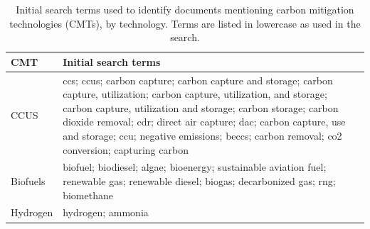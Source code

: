 \begin{table}[htbp]
\centering
\footnotesize
\begin{tabularx}{\textwidth}{@{}p{2.4cm}X@{}}
\toprule
\textbf{CMT} & \textbf{Initial search terms} \\
\midrule
CCUS & ccs; ccus; carbon capture; carbon capture and storage; carbon capture, utilization; carbon capture, utilization, and storage; carbon capture, utilization and storage; carbon storage; carbon dioxide removal; cdr; direct air capture; dac; carbon capture, use and storage; ccu; negative emissions; beccs; carbon removal; co2 conversion; capturing carbon \\
Biofuels & biofuel; biodiesel; algae; bioenergy; sustainable aviation fuel; renewable gas; renewable diesel; biogas; decarbonized gas; rng; biomethane \\
Hydrogen & hydrogen; ammonia \\
\bottomrule
\end{tabularx}
\caption{Initial search terms used to identify documents mentioning carbon mitigation technologies (CMTs), by technology. Terms are listed in lowercase as used in the search.}
\label{tab:search-terms-cmt}
\end{table}
